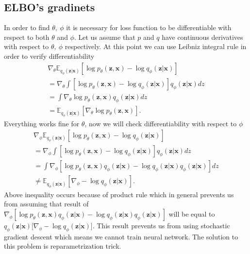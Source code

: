 \documentclass[10pt]{article}
\begin{document}
\subsection{ELBO's gradinets}
In order to find $\theta, \ \phi$ it is necessary for loss function to be differentiable with respect to both  $\theta$ and $\phi$. Let us assume that  $p$ and $q$ have continuous derivatives with respect to $\theta, \ \phi$ respectively. At this point we can use Leibniz integral rule in order to verify differentiability
\begin{gather}
    \nabla_{\theta} \mathbb{E}_{q_{\phi }(\textbf{z}|\textbf{x})}
    \left[ \log p_{\theta }(\textbf{z}, \textbf{x})  - \log q_{\phi }(\textbf{z}|\textbf{x}) \right] \\
    = \nabla_{\theta} \int \left[ \log p_{\theta }(\textbf{z}, \textbf{x})  - \log q_{\phi }(\textbf{z}|\textbf{x}) \right]  q_{\phi }(\textbf{z}|\textbf{x}) dz \\
    = \int \nabla_{\theta} \log p_{\theta }(\textbf{z}, \textbf{x})   q_{\phi }(\textbf{z}|\textbf{x}) dz \\
    =  \mathbb{E}_{q_{\phi }(\textbf{z}|\textbf{x})}
     \left[ \nabla_{\theta} \log p_{\theta }(\textbf{z}, \textbf{x})  \right].
\end{gather}
Everything works fine for $\theta$, now we will check differentiability with respect to $\phi$
\begin{gather}
    \nabla_{\phi} \mathbb{E}_{q_{\phi }(\textbf{z}|\textbf{x})}
    \left[ \log p_{\theta }(\textbf{z}, \textbf{x})  - \log q_{\phi }(\textbf{z}|\textbf{x}) \right] \\
    = \nabla_{\phi} \int \left[ \log p_{\theta }(\textbf{z}, \textbf{x})  - \log q_{\phi }(\textbf{z}|\textbf{x}) \right]  q_{\phi }(\textbf{z}|\textbf{x}) dz \\
    =\int \nabla_{\phi}[ \log p_{\theta }(\textbf{z}, \textbf{x})q_{\phi }(\textbf{z}|\textbf{x})  -\log q_{\phi }(\textbf{z}|\textbf{x})  q_{\phi }(\textbf{z}|\textbf{x})] dz \\
     \neq  \mathbb{E}_{q_{\phi }(\textbf{z}|\textbf{x})}  
     \left[ \nabla_{\phi} -\log q_{\phi }(\textbf{z}|\textbf{x}) \right].
\end{gather}
Above inequality occurs because of product rule which in general prevents us from assuming that result of $\nabla_{\phi}[ \log p_{\theta }(\textbf{z}, \textbf{x})q_{\phi }(\textbf{z}|\textbf{x})  -\log q_{\phi }(\textbf{z}|\textbf{x})  q_{\phi }(\textbf{z}|\textbf{x})]$ will be equal to  $q_{\phi }(\textbf{z}|\textbf{x}) \big[ \nabla_{\phi} -\log q_{\phi }(\textbf{z}|\textbf{x}) \big] $. This result prevents us from using stochastic gradient descent which means we cannot train neural network. The solution to this problem is reparametrization trick.
\end{document}
